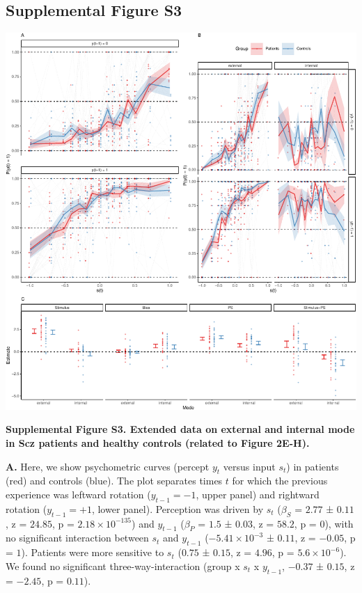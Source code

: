 \documentclass[
]{article}
\begin{document}
\newpage

\hypertarget{supplemental-figure-s3}{%
\subsection{Supplemental Figure S3}\label{supplemental-figure-s3}}

\includegraphics{modes_ketamine_scz_files/figure-latex/Supplemental_Figure_S3-1.pdf}

\textbf{Supplemental Figure S3. Extended data on external and internal
mode in Scz patients and healthy controls (related to Figure 2E-H).}

\textbf{A.} Here, we show psychometric curves (percept \(y_t\) versus
input \(s_t\)) in patients (red) and controls (blue). The plot separates
times \(t\) for which the previous experience was leftward rotation
(\(y_{t-1} = -1\), upper panel) and rightward rotation
(\(y_{t-1} = +1\), lower panel). Perception was driven by \(s_t\)
(\(\beta_S\) = \(2.77\) ± \(0.11\), z = \(24.85\), p =
\(\ensuremath{2.18\times 10^{-135}}\)) and \(y_{t-1}\) (\(\beta_{P}\) =
\(1.5\) ± \(0.03\), z = \(58.2\), p = \(0\)), with no significant
interaction between \(s_t\) and \(y_{t-1}\)
(\(\ensuremath{-5.41\times 10^{-3}}\) ± \(0.11\), z = \(-0.05\), p =
\(1\)). Patients were more sensitive to \(s_t\) (\(0.75\) ± \(0.15\), z
= \(4.96\), p = \(\ensuremath{5.6\times 10^{-6}}\)). We found no
significant three-way-interaction (group x \(s_t\) x \(y_{t-1}\),
\(-0.37\) ± \(0.15\), z = \(-2.45\), p = \(0.11\)).
\end{document}
